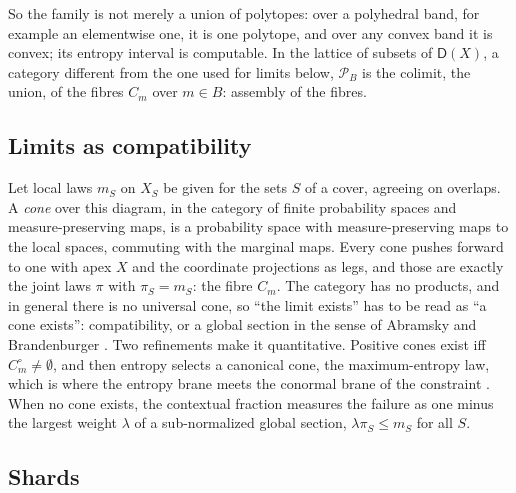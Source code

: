 \documentclass[11pt]{article}
\theoremstyle{definition}
\theoremstyle{remark}
\newcommand{\D}{\mathsf{D}}
\begin{document}
So the family is not merely a union of polytopes: over a polyhedral band, for example an elementwise one, it is one polytope, and
over any convex band it is convex; its entropy interval is computable. In the lattice of subsets of $\D(X)$, a category different from
the one used for limits below, $\mathcal P_B$ is the colimit, the union, of the fibres $C_m$ over $m\in B$: assembly of the fibres.

\subsection{Limits as compatibility}

Let local laws $m_S$ on $X_S$ be given for the sets $S$ of a cover, agreeing on overlaps. A \emph{cone} over this diagram, in the
category of finite probability spaces and measure-preserving maps, is a probability space with measure-preserving maps to the local spaces, commuting with the marginal maps. Every cone pushes
forward to one with apex $X$ and the coordinate projections as legs, and those are exactly the joint laws $\pi$ with $\pi_S=m_S$: the
fibre $C_m$. The category has no products, and in general there is no universal cone, so ``the limit exists'' has
to be read as ``a cone exists'': compatibility, or a global section in the sense of Abramsky and Brandenburger
\cite{AbramskyBrandenburger2011}. Two refinements make it quantitative. Positive cones exist iff $C_m^\circ\ne\emptyset$, and then entropy
selects a canonical cone, the maximum-entropy law, which is where the entropy brane meets the conormal brane of the constraint
\cite[Thm.~3.1]{Bridges}. When no cone exists, the contextual fraction \cite{AbramskyBarbosaMansfield2017} measures the failure as one
minus the largest weight $\lambda$ of a sub-normalized global section, $\lambda\pi_S\le m_S$ for all $S$.

\subsection{Shards}
\end{document}
